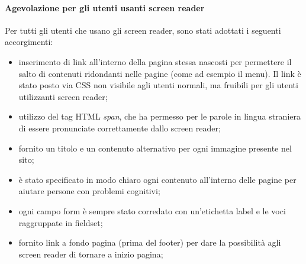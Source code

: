 \paragraph*{Agevolazione per gli utenti usanti screen reader}Per tutti gli utenti che usano gli screen reader, sono stati adottati i seguenti accorgimenti:
\begin{itemize}

    \item inserimento di link all'interno della pagina stessa nascosti per permettere il salto di contenuti ridondanti nelle pagine (come ad esempio il menu). Il link è stato posto via CSS non visibile agli utenti normali, ma fruibili per gli utenti utilizzanti screen reader;
    \item utilizzo del tag HTML \textit{span}, che ha permesso per le parole in lingua straniera di essere pronunciate correttamente dallo screen reader;
    \item fornito un titolo e un contenuto alternativo per ogni immagine presente nel sito;

    \item è stato specificato in modo chiaro ogni contenuto all'interno delle pagine per aiutare persone con problemi cognitivi;

    \item ogni campo form è sempre stato corredato con un'etichetta label e le voci raggruppate in fieldset;

    \item fornito link a fondo pagina (prima del footer) per dare la possibilità agli screen reader di tornare a inizio pagina;

\end{itemize}

